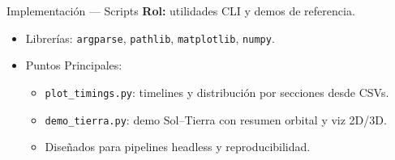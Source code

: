 \begin{frame}{Implementación — Scripts}
    \textbf{Rol:} utilidades CLI y demos de referencia.
    \vspace{0.2cm}
    \begin{itemize}
        \item Librerías: \texttt{argparse}, \texttt{pathlib}, \texttt{matplotlib}, \texttt{numpy}.
        \item Puntos Principales:
        \begin{itemize}
            \item \texttt{plot\_timings.py}: timelines y distribución por secciones desde CSVs.
            \item \texttt{demo\_tierra.py}: demo Sol–Tierra con resumen orbital y viz 2D/3D.
            \item Diseñados para pipelines headless y reproducibilidad.
        \end{itemize}
    \end{itemize}
\end{frame}

